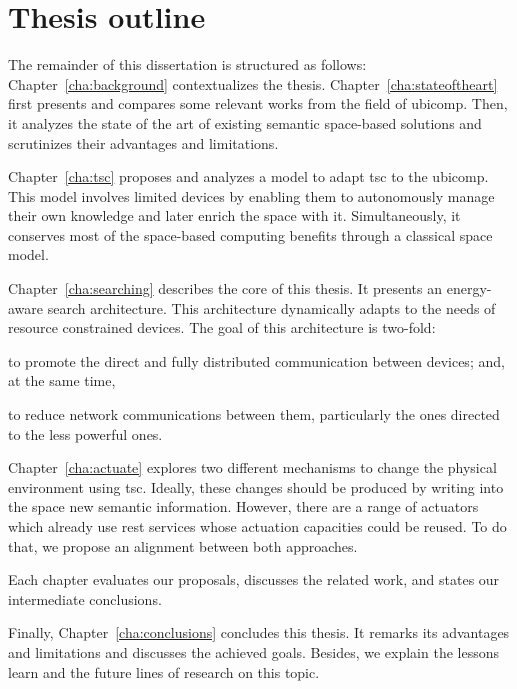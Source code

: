 \section{Thesis outline}
\label{sec:Outline}


The remainder of this dissertation is structured as follows:
Chapter~\ref{cha:background} contextualizes the thesis.
Chapter~\ref{cha:stateoftheart} first presents and compares some relevant works from the field of \acl{ubicomp}. %
Then, it analyzes the state of the art of existing semantic space-based solutions and scrutinizes their advantages and limitations.

Chapter~\ref{cha:tsc} proposes and analyzes a model to adapt \ac{tsc} to the \ac{ubicomp}.
This model involves limited devices by enabling them to autonomously manage their own knowledge and later enrich the space with it.
Simultaneously, it conserves most of the space-based computing benefits through a classical space model.

Chapter~\ref{cha:searching} describes the core of this thesis.
It presents an energy-aware search architecture.
This architecture dynamically adapts to the needs of resource constrained devices.
The goal of this architecture is two-fold:
\begin{enumerate*}[label=\itshape\alph*\upshape)]
\item to promote the direct and fully distributed communication between devices;
and, at the same time,
\item to reduce network communications between them, particularly the ones directed to the less powerful ones.
\end{enumerate*}

Chapter~\ref{cha:actuate} explores two different mechanisms to change the physical environment using \ac{tsc}.
Ideally, these changes should be produced by writing into the space new semantic information. %
However, there are a range of actuators which already use \ac{rest} services whose actuation capacities could be reused.
To do that, we propose an alignment between both approaches. %


Each chapter evaluates our proposals, discusses the related work, and states our intermediate conclusions. %

Finally, Chapter~\ref{cha:conclusions} concludes this thesis.
It remarks its advantages and limitations and discusses the achieved goals.
Besides, we explain the lessons learn and the future lines of research on this topic. %
